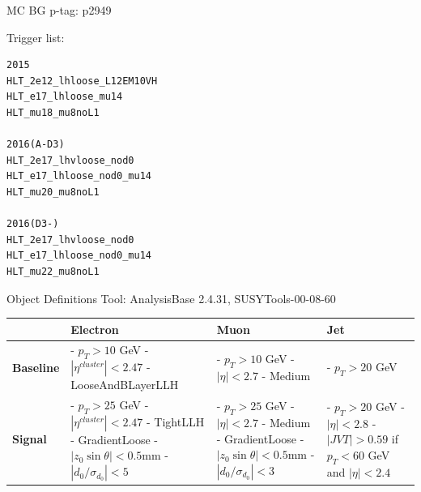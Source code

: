 \documentclass[mathserif,serif]{beamer}
\begin{document}
\begin{frame}{MC BG}
p-tag: p2949
\end{frame}

\begin{frame}[fragile]
\small
Trigger list:\\
\scriptsize
\begin{verbatim}
2015
HLT_2e12_lhloose_L12EM10VH
HLT_e17_lhloose_mu14
HLT_mu18_mu8noL1

2016(A-D3)
HLT_2e17_lhvloose_nod0
HLT_e17_lhloose_nod0_mu14
HLT_mu20_mu8noL1

2016(D3-)
HLT_2e17_lhvloose_nod0
HLT_e17_lhloose_nod0_mu14
HLT_mu22_mu8noL1
\end{verbatim}
\end{frame}

\begin{frame}{Object Definitions}
\small
Tool: AnalysisBase 2.4.31, SUSYTools-00-08-60\\

\centering
\begin{table}
\small
\begin{tabularx}{\textwidth}{p{1.5cm} | p{3cm} | p{3cm} | p{3cm}}
& \textbf{Electron} & \textbf{Muon} & \textbf{Jet}\\
\hline
\textbf{Baseline}
& - $p_T>10$ GeV \newline - $|\eta^{cluster}| < 2.47$ \newline - LooseAndBLayerLLH
& - $p_T>10$ GeV \newline - $|\eta| < 2.7$ \newline - Medium
& - $p_T>20$ GeV \\
\hline
\textbf{Signal}
& - $p_T > 25$ GeV \newline - $|\eta^{cluster}| < 2.47$ \newline - TightLLH \newline - GradientLoose \newline - $|z_0 \sin \theta| < 0.5$mm \newline - $|d_0/\sigma_{d_0}| < 5$
& - $p_T > 25$ GeV \newline - $|\eta| < 2.7$ \newline - Medium \newline - GradientLoose \newline - $|z_0 \sin \theta| < 0.5$mm \newline - $|d_0/\sigma_{d_0}| < 3$
& - $p_T > 20$ GeV \newline - $|\eta|<2.8$ \newline \newline - $|JVT| > 0.59$ \newline if $p_T < 60$ GeV \newline and $|\eta| < 2.4$
\end{tabularx}
\end{table}


\end{frame}
\end{document}
